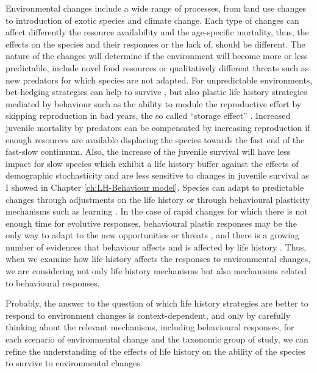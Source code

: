 Environmental changes include a wide range of processes, from land use changes
to introduction of exotic species and climate change. Each type of changes can
affect differently the resource availability and the age-specific mortality,
thus, the effects on the species and their responses or the lack of, should be
different. The nature of the changes will determine if the environment will
become more or less predictable, include novel food resources or qualitatively
different threats such as new predators for which species are not adapted.
For unpredictable environments, bet-hedging strategies can help to survive
\citep{Starrfelt2012}, but also plastic life history strategies mediated by
behaviour such as the ability to module the reproductive effort by skipping
reproduction in bad years, the so called ``storage effect'' \citep{Forcada2008}.
Increased juvenile mortality by predators can be compensated by increasing
reproduction if enough resources are available \citep{Yeh2004} displacing the
species towards the fast end of the fast-slow continuum. Also, the increase of
the juvenile survival will have less impact for slow species which exhibit a
life history buffer against the effects of demographic stochasticity and are
less sensitive to changes in juvenile survival as I showed in Chapter
\ref{ch:LH-Behaviour model}.
Species can adapt to predictable changes through adjustments on the life
history \citep{Evans2005} or through behavioural plasticity mechanisms such as
learning \citep{Laundre2001,Evans2012}.
In the case of rapid changes for which there is not enough time for evolutive
responses, behavioural plastic responses may be the only way to adapt to the
new opportunities or threats \citep{Sol2009}, and there is a growing number of
evidences that behaviour affects and is affected by life history
\citep{Sol2016}.
Thus, when we examine how life history affects the responses to environmental
changes, we are considering not only life history mechanisms but also mechanisms
related to behavioural responses.

Probably, the answer to the question of which life history strategies are
better to respond to environment changes is context-dependent, and only by
carefully thinking about the relevant mechanisms, including behavioural
responses, for each scenario of environmental change and the taxonomic group of
study, we can refine the understanding of the effects of life history on the
ability of the species to survive to environmental changes.


\clearpage

